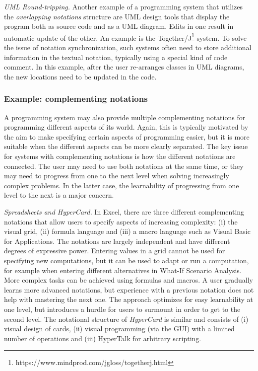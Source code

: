 \documentclass[english,submission]{programming}
\begin{document}
\emph{UML Round-tripping.} Another example of a programming system that
utilizes the \emph{overlapping notations} structure are UML design tools
that display the program both as source code and as a UML diagram. Edits
in one result in automatic update of the other. An example is the
Together/J\footnote{https://www.mindprod.com/jgloss/togetherj.html}
system. To solve the issue of notation synchronization, such systems
often need to store additional information in the textual notation,
typically using a special kind of code comment. In this example, after
the user re-arranges classes in UML diagrams, the new locations need to
be updated in the code.

\hypertarget{example-complementing-notations}{%
\subsubsection{Example: complementing
notations}\label{example-complementing-notations}}

A programming system may also provide multiple complementing notations
for programming different aspects of its world. Again, this is typically
motivated by the aim to make specifying certain aspects of programming
easier, but it is more suitable when the different aspects can be more
clearly separated. The key issue for systems with complementing
notations is how the different notations are connected. The user may
need to use both notations at the same time, or they may need to
progress from one to the next level when solving increasingly complex
problems. In the latter case, the learnability of progressing from one
level to the next is a major concern.

\emph{Spreadsheets and HyperCard.} In Excel, there are three different
complementing notations that allow users to specify aspects of
increasing complexity: (i) the visual grid, (ii) formula language and
(iii) a macro language such as Visual Basic for Applications. The
notations are largely independent and have different degrees of
expressive power. Entering values in a grid cannot be used for
specifying new computations, but it can be used to adapt or run a
computation, for example when entering different alternatives in What-If
Scenario Analysis. More complex tasks can be achieved using formulas and
macros. A user gradually learns more advanced notations, but experience
with a previous notation does not help with mastering the next one. The
approach optimizes for easy learnability at one level, but introduces a
hurdle for users to surmount in order to get to the second level. The
notational structure of \emph{HyperCard} is similar and consists of (i)
visual design of cards, (ii) visual programming (via the GUI) with a
limited number of operations and (iii) HyperTalk for arbitrary
scripting.
\end{document}
